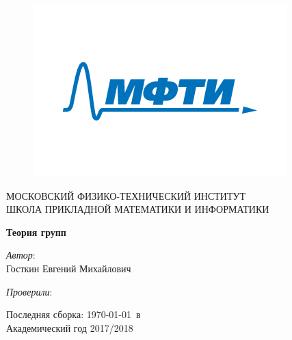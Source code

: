 \documentclass[11pt,a4paper]{report}
\theoremstyle{definition}
\theoremstyle{definition}
\theoremstyle{definition}
\begin{document}
\begin{titlepage}
\enlargethispage{\footskip}
\setlength{\parindent}{0pt}

\begin{center}
    \onehalfspacing
    
\begin{figure}[t]
    \centering
    \includegraphics[scale=0.35]{./logo.png}
\end{figure}    

    \large
    МОСКОВСКИЙ ФИЗИКО-ТЕХНИЧЕСКИЙ ИНСТИТУТ\\
    ШКОЛА ПРИКЛАДНОЙ МАТЕМАТИКИ И ИНФОРМАТИКИ

    \vspace{20mm}

    \huge
    \textbf{Теория групп}
\end{center}

\vspace{23mm}

\begin{minipage}[t]{0.5\textwidth}
    \raggedright
    \onehalfspacing
    \large
    \textit{Автор}:\\[.5\baselineskip]
    Госткин Евгений Михайлович
\end{minipage}%
\begin{minipage}[t]{0.5\textwidth}
    \raggedleft
    \onehalfspacing
    \large
    \textit{Проверили}:\\[.5\baselineskip]
    

    \vspace{5mm}
\end{minipage}%

\vspace{\fill}

\begin{minipage}[b]{\textwidth}
    \centering
    \onehalfspacing
    \large   
    Последняя сборка: \today\ в \currenttime \\
    Академический год 2017/2018

    \vspace{-20mm} 
\end{minipage}%
\end{titlepage}
  \setlength{\parindent}{1cm}
\end{document}
